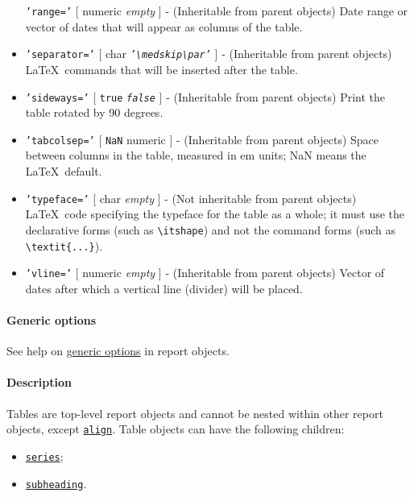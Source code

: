 \begin{itemize}
  \texttt{'range='} {[} numeric \textbar{} \emph{empty} {]} -
  (Inheritable from parent objects) Date range or vector of dates that
  will appear as columns of the table.
\item
  \texttt{'separator='} {[} char \textbar{}
  \emph{\texttt{'\textbackslash{}medskip\textbackslash{}par'}} {]} -
  (Inheritable from parent objects) \LaTeX~commands that will be
  inserted after the table.
\item
  \texttt{'sideways='} {[} \texttt{true} \textbar{}
  \emph{\texttt{false}} {]} - (Inheritable from parent objects) Print
  the table rotated by 90 degrees.
\item
  \texttt{'tabcolsep='} {[} \texttt{NaN} \textbar{} numeric {]} -
  (Inheritable from parent objects) Space between columns in the table,
  measured in em units; NaN means the \LaTeX~default.
\item
  \texttt{'typeface='} {[} char \textbar{} \emph{empty} {]} - (Not
  inheritable from parent objects) \LaTeX~code specifying the typeface
  for the table as a whole; it must use the declarative forms (such as
  \texttt{\textbackslash{}itshape}) and not the command forms (such as
  \texttt{\textbackslash{}textit\{...\}}).
\item
  \texttt{'vline='} {[} numeric \textbar{} \emph{empty} {]} -
  (Inheritable from parent objects) Vector of dates after which a
  vertical line (divider) will be placed.
\end{itemize}

\paragraph{Generic options}\label{generic-options}

See help on \href{report/Contents}{generic options} in report objects.

\paragraph{Description}\label{description}

Tables are top-level report objects and cannot be nested within other
report objects, except \href{report/align}{\texttt{align}}. Table
objects can have the following children:

\begin{itemize}
\itemsep1pt\parskip0pt
\item
  \href{report/series}{\texttt{series}};
\item
  \href{report/subheading}{\texttt{subheading}}.
\end{itemize}

